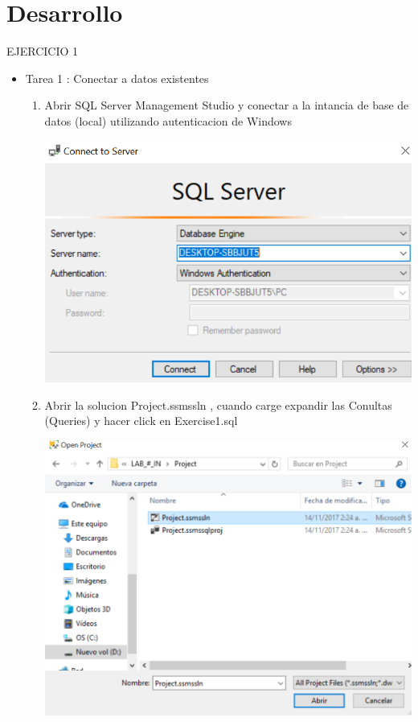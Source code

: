 \section{Desarrollo } 


 EJERCICIO 1

\begin{itemize}
\item Tarea 1 : Conectar a datos existentes


\begin{enumerate}
\item Abrir SQL Server Management Studio y conectar a la intancia de base de datos (local) utilizando autenticacion de Windows 

\begin{center}
\includegraphics[scale=0.55]{./Imagenes/1.png}
\end{center}

\item Abrir la solucion Project.ssmssln , cuando carge expandir las Conultas (Queries) y hacer click en Exercise1.sql

\begin{center}
\includegraphics[scale=0.55]{./Imagenes/2.png}
\end{center}


\end{enumerate}
\end{itemize}
